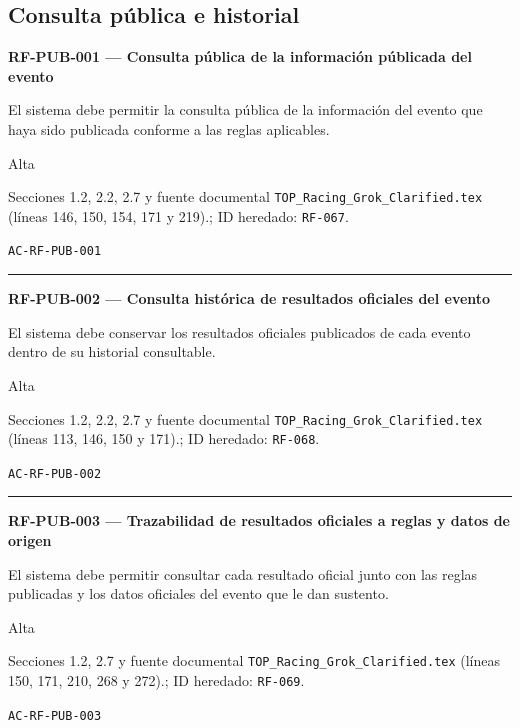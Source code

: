 \documentclass[10pt,letterpaper]{article}
\begin{document}
\subsection{Consulta pública e historial}
\noindent\textbf{RF-PUB-001 --- Consulta pública de la información públicada del evento}\par
\begin{description}[style=nextline,leftmargin=3.15cm,labelwidth=2.8cm,font=\normalfont\bfseries]
\item[Obligación] El sistema debe permitir la consulta pública de la información del evento que haya sido publicada conforme a las reglas aplicables.
\item[Prioridad] Alta
\item[Procedencia] Secciones 1.2, 2.2, 2.7 y fuente documental \texttt{TOP\_Racing\_Grok\_Clarified.tex} (líneas 146, 150, 154, 171 y 219).; ID heredado: \texttt{RF-067}.
\item[Verificación] \texttt{AC-RF-PUB-001}
\end{description}
\vspace{0.25em}\hrule\vspace{0.65em}
\noindent\textbf{RF-PUB-002 --- Consulta histórica de resultados oficiales del evento}\par
\begin{description}[style=nextline,leftmargin=3.15cm,labelwidth=2.8cm,font=\normalfont\bfseries]
\item[Obligación] El sistema debe conservar los resultados oficiales publicados de cada evento dentro de su historial consultable.
\item[Prioridad] Alta
\item[Procedencia] Secciones 1.2, 2.2, 2.7 y fuente documental \texttt{TOP\_Racing\_Grok\_Clarified.tex} (líneas 113, 146, 150 y 171).; ID heredado: \texttt{RF-068}.
\item[Verificación] \texttt{AC-RF-PUB-002}
\end{description}
\vspace{0.25em}\hrule\vspace{0.65em}
\noindent\textbf{RF-PUB-003 --- Trazabilidad de resultados oficiales a reglas y datos de origen}\par
\begin{description}[style=nextline,leftmargin=3.15cm,labelwidth=2.8cm,font=\normalfont\bfseries]
\item[Obligación] El sistema debe permitir consultar cada resultado oficial junto con las reglas publicadas y los datos oficiales del evento que le dan sustento.
\item[Prioridad] Alta
\item[Procedencia] Secciones 1.2, 2.7 y fuente documental \texttt{TOP\_Racing\_Grok\_Clarified.tex} (líneas 150, 171, 210, 268 y 272).; ID heredado: \texttt{RF-069}.
\item[Verificación] \texttt{AC-RF-PUB-003}
\end{description}
\end{document}
